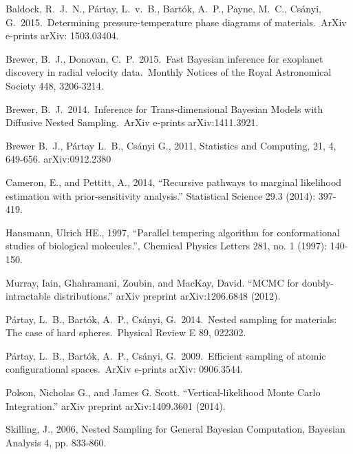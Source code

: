 \documentclass[journal,article,accept,moreauthors,pdftex,12pt,a4paper]{mdpi}
\begin{document}
\begin{thebibliography}{999} %

 Baldock, R.~J.~N., 
P{\'a}rtay, L.~v.~B., Bart{\'o}k, A.~P., Payne, M.~C., Cs{\'a}nyi, G.\ 
2015.\ Determining pressure-temperature phase diagrams of materials.\ ArXiv 
e-prints arXiv: 1503.03404. 

 Brewer, B.~J., 
Donovan, C.~P.\ 2015.\ Fast Bayesian inference for exoplanet discovery in 
radial velocity data.\ Monthly Notices of the Royal Astronomical Society 
448, 3206-3214. 

 Brewer, B.~J.\ 2014.\ Inference 
for Trans-dimensional Bayesian Models with Diffusive Nested Sampling.\ 
ArXiv e-prints arXiv:1411.3921.

 Brewer B.~J., P{\'a}rtay L.~B., Cs{\'a}nyi G., 2011,
Statistics and Computing, 21, 4, 649-656. arXiv:0912.2380

 Cameron, E., and Pettitt, A., 2014,
``Recursive pathways to marginal likelihood estimation with
prior-sensitivity analysis.'' Statistical Science 29.3 (2014): 397-419.

\bibitem[Hansmann(1997)]{pt} Hansmann, Ulrich HE., 1997, ``Parallel tempering algorithm for conformational studies of biological molecules.'', Chemical Physics Letters 281, no. 1 (1997): 140-150.

\bibitem[Murray(2012)]{murray} Murray, Iain, Ghahramani, Zoubin, and MacKay, David.
``MCMC for doubly-intractable distributions.'' arXiv preprint arXiv:1206.6848 (2012).

\bibitem[P{\'a}rtay et al.(2014)]{2014PhRvE..89b2302P} P{\'a}rtay, L.~B., 
Bart{\'o}k, A.~P., Cs{\'a}nyi, G.\ 2014.\ Nested sampling for materials: 
The case of hard spheres.\ Physical Review E 89, 022302. 

 P{\'a}rtay, L.~B., 
Bart{\'o}k, A.~P., Cs{\'a}nyi, G.\ 2009.\ Efficient sampling of atomic 
configurational spaces.\ ArXiv e-prints arXiv: 0906.3544. 

Polson, Nicholas G., and James G. Scott. ``Vertical-likelihood Monte Carlo
Integration.'' arXiv preprint arXiv:1409.3601 (2014).

 Skilling, J., 2006, Nested Sampling for General Bayesian Computation, Bayesian Analysis 4, pp. 833-860.


\end{thebibliography}
\end{document}
